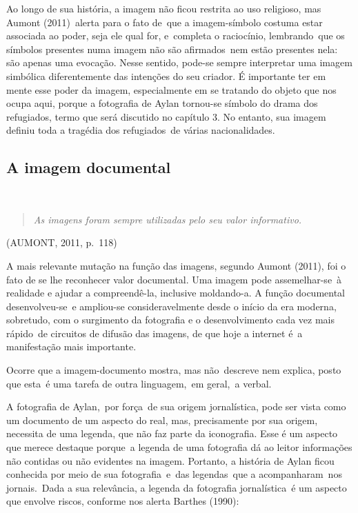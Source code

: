 \documentclass[
  letterpaper,
]{abntex2}
\begin{document}
Ao longo de sua história, a imagem não ficou restrita ao uso religioso,
mas Aumont (2011)~alerta para o fato de~que a imagem-símbolo costuma
estar associada ao poder, seja ele qual for, e~completa o raciocínio,
lembrando~que os símbolos presentes numa imagem não são afirmados~nem
estão presentes nela: são apenas uma evocação. Nesse sentido, pode-se
sempre interpretar uma imagem simbólica diferentemente das intenções do
seu criador. É importante ter em mente esse poder da imagem,
especialmente em se tratando do objeto que nos ocupa aqui, porque a
fotografia de Aylan tornou-se símbolo do drama dos refugiados, termo que
será discutido no capítulo 3. No entanto, sua imagem definiu toda a
tragédia dos refugiados~de várias nacionalidades.~

\hypertarget{a-imagem-documental}{%
\subsection{A imagem documental~}\label{a-imagem-documental}}

~

\begin{quote}
\emph{As imagens foram sempre utilizadas pelo seu valor informativo.}
\end{quote}

(AUMONT, 2011, p.~118) ~

A mais relevante mutação na função das imagens, segundo Aumont (2011),
foi o fato de se lhe reconhecer valor documental. Uma imagem pode
assemelhar-se~à realidade e ajudar a compreendê-la, inclusive
moldando-a. A função documental desenvolveu-se~e ampliou-se
consideravelmente desde o início da era moderna, sobretudo, com o
surgimento da fotografia e o desenvolvimento cada vez mais rápido~de
circuitos de difusão das imagens, de que hoje a internet é~a
manifestação mais importante.~

Ocorre que a imagem-documento mostra, mas não~descreve nem explica,
posto que esta~é uma tarefa de outra linguagem,~em geral,~a verbal.~

A fotografia de Aylan,~por força~de sua origem jornalística, pode ser
vista como um documento de um aspecto do real, mas, precisamente por sua
origem, necessita de uma legenda, que não faz parte da iconografia. Esse
é um aspecto que merece destaque porque~a legenda de uma fotografia dá
ao leitor informações não contidas ou não evidentes na imagem. Portanto,
a história de Aylan ficou conhecida por meio de sua fotografia~e~das
legendas~que a acompanharam~nos jornais.~Dada a sua relevância, a
legenda da fotografia jornalística~é um aspecto que envolve riscos,
conforme nos alerta Barthes (1990):~ ~
\end{document}
